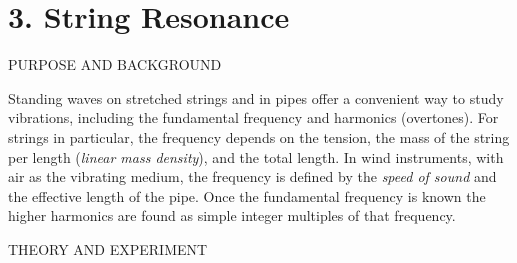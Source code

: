 \documentclass[11pt]{NSF}
\begin{document}
     
\section{3. String Resonance}

PURPOSE AND BACKGROUND

Standing waves on stretched strings and in pipes offer a convenient way to
study vibrations, including the fundamental frequency and harmonics
(overtones). For strings in particular, the frequency depends on the tension,
the mass of the string per length ({\em linear mass density}), and the total length.
In wind instruments, with air as the vibrating medium, the frequency is defined
by the {\em speed of sound} and the effective length of the pipe. Once the
fundamental frequency is known the higher harmonics are found as simple integer
multiples of that frequency.

THEORY AND EXPERIMENT
\end{document}

